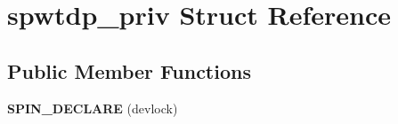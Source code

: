 \hypertarget{structspwtdp__priv}{}\section{spwtdp\+\_\+priv Struct Reference}
\label{structspwtdp__priv}
\subsection*{Public Member Functions}
\begin{DoxyCompactItemize}
\item 
\mbox{\label{structspwtdp__priv_aac9e9b6e725c11552d22336d3c2b1c4a}} 
{\bfseries S\+P\+I\+N\+\_\+\+D\+E\+C\+L\+A\+RE} (devlock)
\end{DoxyCompactItemize}
